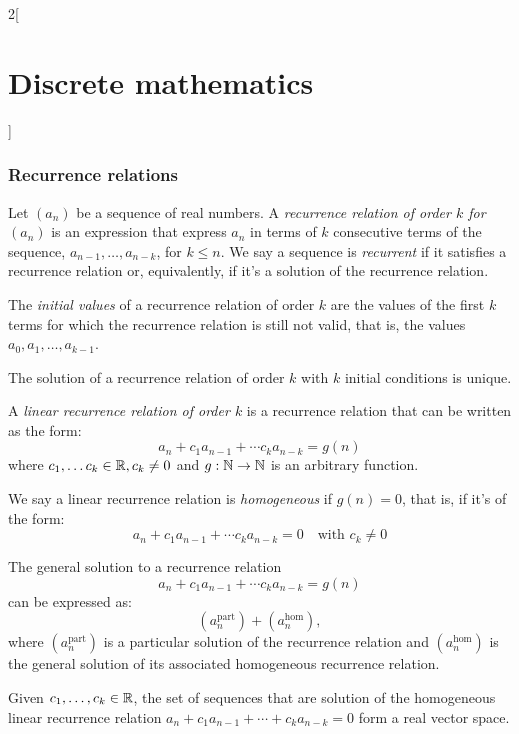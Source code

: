\documentclass[../../../main.tex]{subfiles}
\begin{document}
\begin{multicols}{2}[\section{Discrete mathematics}]
  \subsubsection{Recurrence relations}
  \begin{definition}
    Let $(a_n)$ be a sequence of real numbers. A \textit{recurrence relation of order $k$ for $(a_n)$} is an expression that express $a_n$ in terms of $k$ consecutive terms of the sequence, $a_{n-1},\ldots,a_{n-k}$, for $k\leq n$. We say a sequence is \textit{recurrent} if it satisfies a recurrence relation or, equivalently, if it's a solution of the recurrence relation.
  \end{definition}
  \begin{definition}
    The \textit{initial values} of a recurrence relation of order $k$ are the values of the first $k$ terms for which the recurrence relation is still not valid, that is, the values $a_0,a_1,\ldots,a_{k-1}$.
  \end{definition}
  \begin{lemma}
    The solution of a recurrence relation of order $k$ with $k$ initial conditions is unique.
  \end{lemma}
  \begin{definition}
    A \textit{linear recurrence relation of order $k$} is a recurrence relation that can be written as the form: $$a_n+c_1a_{n-1}+\cdots c_ka_{n-k}=g(n)$$ where $c_1,\ldots c_k\in\mathbb{R} , c_k\ne 0$ and $g:\mathbb{N} \rightarrow\mathbb{N} $ is an arbitrary function.
  \end{definition}
  \begin{definition}
    We say a linear recurrence relation is \textit{homogeneous} if $g(n)=0$, that is, if it's of the form: $$a_n+c_1a_{n-1}+\cdots c_ka_{n-k}=0\quad\text{with }c_k\ne 0$$
  \end{definition}
  \begin{prop}
    The general solution to a recurrence relation $$a_n+c_1a_{n-1}+\cdots c_ka_{n-k}=g(n)$$ can be expressed as: $$(a_n^\text{part})+(a_n^\text{hom}),$$ where $(a_n^\text{part})$ is a particular solution of the recurrence relation and $(a_n^\text{hom})$ is the general solution of its associated homogeneous recurrence relation.
  \end{prop}
  \begin{prop}
    Given $c_1,\ldots,c_k\in\mathbb{R} $, the set of sequences that are solution of the homogeneous linear recurrence relation $a_n+c_1a_{n-1}+\cdots+c_ka_{n-k}=0$ form a real vector space.
  \end{prop}

\end{multicols}
\end{document}
